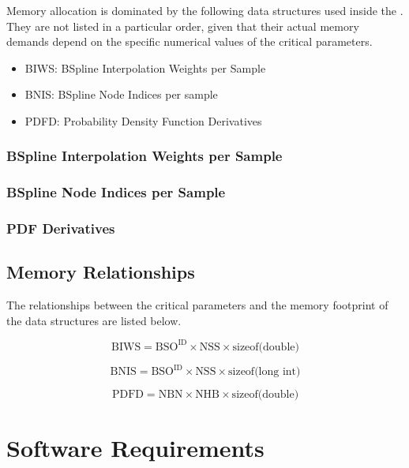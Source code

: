 \documentclass{InsightArticle}
\begin{document}
Memory allocation is dominated by the following data structures used inside the
. They are not listed in a 
particular order, given that their actual memory demands depend on the specific
numerical values of the critical parameters.


\begin{itemize}
\item BIWS: BSpline Interpolation Weights per Sample
\item BNIS: BSpline Node Indices per sample
\item PDFD: Probability Density Function Derivatives
\end{itemize}


\subsubsection{BSpline Interpolation Weights per Sample}
\subsubsection{BSpline Node Indices per Sample}
\subsubsection{PDF Derivatives}

\subsection{Memory Relationships}

The relationships between the critical parameters and the memory footprint of
the data structures are listed below.

\begin{equation}
\mbox{BIWS} = \mbox{BSO}^{\mbox{ID}} \times \mbox{NSS} \times \mbox{sizeof(double)}
\end{equation}

\begin{equation}
\mbox{BNIS} = \mbox{BSO}^{\mbox{ID}} \times \mbox{NSS} \times \mbox{sizeof(long int)}
\end{equation}

\begin{equation}
\mbox{PDFD} = \mbox{NBN} \times \mbox{NHB} \times  \mbox{sizeof(double)}
\end{equation}



\section{Software Requirements}
\end{document}
